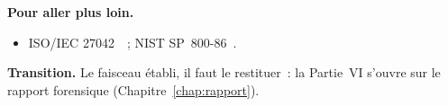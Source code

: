 \bigskip

\begin{boxinfo}
\textbf{Pour aller plus loin.}
\begin{itemize}
    \item ISO/IEC 27042~\cite{iso27042}~; NIST SP~800-86~\cite{nist80086}.
\end{itemize}
\end{boxinfo}

\begin{boxinfo}
\textbf{Transition.} Le faisceau établi, il faut le restituer~: la Partie~VI
s'ouvre sur le rapport forensique (Chapitre~\ref{chap:rapport}).
\end{boxinfo}
